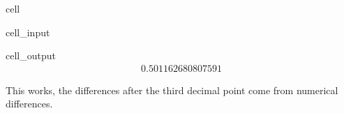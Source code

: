 \documentclass[letterpaper,10pt,english]{jupyterBook}
\begin{document}
\begin{sphinxuseclass}{cell}\begin{sphinxVerbatimInput}

\begin{sphinxuseclass}{cell_input}
\begin{sphinxVerbatim}[commandchars=\\\{\}]

\end{sphinxVerbatim}

\end{sphinxuseclass}\end{sphinxVerbatimInput}
\begin{sphinxVerbatimOutput}

\begin{sphinxuseclass}{cell_output}\begin{equation*}
\begin{split}0.501162680807591\end{split}
\end{equation*}
\end{sphinxuseclass}\end{sphinxVerbatimOutput}

\end{sphinxuseclass}
\sphinxAtStartPar
This works, the differences after the third decimal point come from numerical differences.
\end{document}
